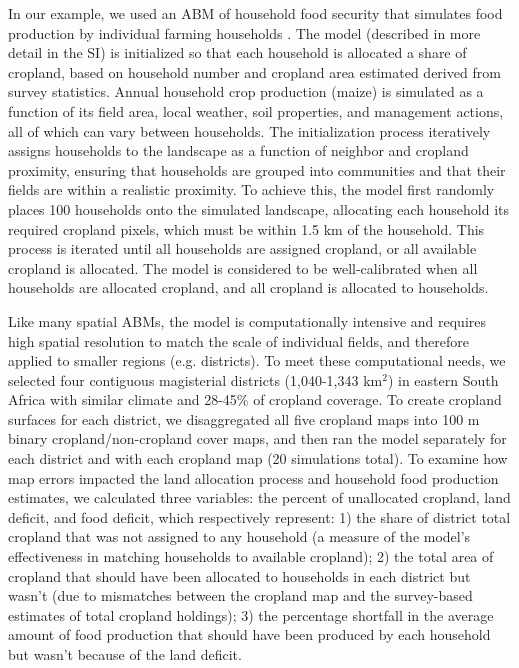 \documentclass[a4paper]{article}
\begin{document}
In our example, we used an ABM of household food security that simulates food production by individual farming households \citep[the agents; ][]{chen_dependency_2013}. The model (described in more detail in the SI) is initialized so that each household is allocated a share of cropland, based on household number and cropland area estimated derived from survey statistics. Annual household crop production (maize) is simulated as a function of its field area, local weather, soil properties, and management actions, all of which can vary between households. The initialization process iteratively assigns households to the landscape as a function of neighbor and cropland proximity, ensuring that households are grouped into communities and that their fields are within a realistic proximity. To achieve this, the model first randomly places 100 households onto the simulated landscape, allocating each household its required cropland pixels, which must be within 1.5 km of the household. This process is iterated until all households are assigned cropland, or all available cropland is allocated. The model is considered to be well-calibrated when all households are allocated cropland, and all cropland is allocated to households. 

Like many spatial ABMs, the model is computationally intensive and requires high spatial resolution to match the scale of individual fields, and therefore applied to smaller regions (e.g. districts). To meet these computational needs, we selected four contiguous magisterial districts (1,040-1,343 km$^2$) in eastern South Africa with similar climate and 28-45\% of cropland coverage. To create cropland surfaces for each district, we disaggregated all five cropland maps into 100 m binary cropland/non-cropland cover maps, and then ran the model separately for each district and with each cropland map (20 simulations total). To examine how map errors impacted the land allocation process and household food production estimates, we calculated three variables: the percent of unallocated cropland, land deficit, and food deficit, which respectively represent: 1) the share of district total cropland that was not assigned to any household (a measure of the model's effectiveness in matching households to available cropland); 2) the total area of cropland that should have been allocated to households in each district but wasn't (due to mismatches between the cropland map and the survey-based estimates of total cropland holdings); 3) the percentage shortfall in the average amount of food production that should have been produced by each household but wasn't because of the land deficit. 
\end{document}

